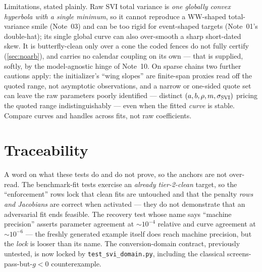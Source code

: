 \documentclass[11pt]{article}
\begin{document}
Limitations, stated plainly. Raw SVI total variance is \emph{one globally
convex hyperbola with a single minimum}, so it cannot reproduce a WW-shaped
total-variance smile (Note~03) and can be too rigid for event-shaped targets
(Note~01's double-hat); its single global curve can also over-smooth a sharp
short-dated skew. It is butterfly-clean only over a cone the coded fences do
not fully certify (\cref{sec:noarb}), and carries no calendar coupling on its
own --- that is supplied, softly, by the model-agnostic hinge of Note~10. On
sparse chains two further cautions apply: the initializer's ``wing slopes''
are finite-span proxies read off the quoted range, not asymptotic
observations, and a narrow or one-sided quote set can leave the raw
parameters poorly identified --- distinct $(a,b,\rho,m,\sigma_{\mathrm{SVI}})$ pricing the
quoted range indistinguishably --- even when the fitted \emph{curve} is
stable. Compare curves and handles across fits, not raw coefficients.

\section{Traceability}
\label{sec:traceability}

A word on what these tests do and do not prove, so the anchors are not
over-read. The benchmark-fit tests exercise an \emph{already tier-2-clean}
target, so the ``enforcement'' rows lock that clean fits are untouched and
that the penalty \emph{rows and Jacobians} are correct when activated --- they
do not demonstrate that an adversarial fit ends feasible. The recovery test
whose name says ``machine precision'' asserts parameter agreement at
$\sim10^{-4}$ relative and curve agreement at $\sim10^{-6}$ --- the freshly
generated example itself does reach machine precision, but the \emph{lock} is
looser than its name. The conversion-domain contract, previously untested, is
now locked by \texttt{test\_svi\_domain.py}, including the classical
screens-pass-but-$g<0$ counterexample.
\end{document}

